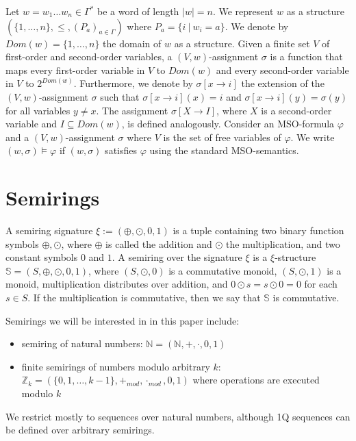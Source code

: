 \documentclass[en]{pracamgr}
\theoremstyle{definition}
\begin{document}
Let $w = w_1\ldots w_n \in \Gamma^*$ be a word of length $|w| = n$. We represent $w$ as a structure $(\{1,\ldots,n\}, \leq, (P_a)_{a \in \Gamma})$ where $P_a = \{i \ | \ w_i = a\}$. We denote by $Dom(w) = \{1,\ldots,n\}$ the domain of $w$ as a structure. Given a finite set $V$ of first-order and second-order variables, a $(V,w)$-assignment $\sigma$ is a function that maps every first-order variable in $V$ to $Dom(w)$ and every second-order variable in $V$ to $2^{Dom(w)}$. Furthermore, we denote by $\sigma[x \rightarrow i]$ the extension of the $(V,w)$-assignment $\sigma$ such that $\sigma[x \rightarrow i](x) = i$ and $\sigma[x \rightarrow i](y) = \sigma(y)$ for all variables $y \ne x$. The assignment $\sigma[X \rightarrow I]$, where $X$ is a second-order variable and $I \subseteq Dom(w)$, is defined analogously. Consider an MSO-formula $\varphi$ and a $(V,w)$-assignment $\sigma$ where $V$ is the set of free variables of $\varphi$. We write $(w, \sigma) \models \varphi$ if $(w, \sigma)$ satisfies $\varphi$ using the standard MSO-semantics.

\section{Semirings}

A semiring signature $\xi := (\oplus, \odot, 0, 1)$ is a tuple containing two binary function symbols $\oplus, \odot$, where $\oplus$ is called the addition and $\odot$ the multiplication, and two constant symbols $0$ and $1$. A semiring over the signature $\xi$ is a $\xi$-structure $\mathbb{S} = (S, \oplus, \odot, 0, 1)$, where $(S, \odot, 0)$ is a commutative monoid, $(S, \odot, 1)$ is a monoid, multiplication distributes over addition, and $0 \odot s = s \odot 0 = 0$ for each $s \in S$. If the multiplication is commutative, then we say that $\mathbb{S}$ is commutative.

Semirings we will be interested in in this paper include:

\begin{itemize}
    \item semiring of natural numbers: $\mathbb{N} = (\mathbb{N}, +, \cdot, 0, 1)$
    \item finite semirings of numbers modulo arbitrary $k$: $ \mathbb{Z}_k = (\{0,1,\ldots,k-1\}, +_{mod}, \cdot_{mod}, 0, 1)$ where operations are executed modulo $k$
\end{itemize}

We restrict mostly to sequences over natural numbers, although 1Q sequences can be defined over arbitrary semirings.
\end{document}
